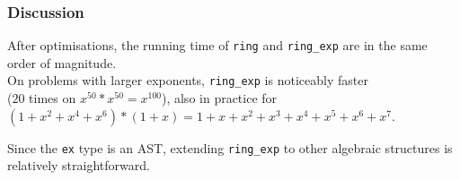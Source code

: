 \documentclass{beamer}
\newcommand{\lean}[1]{\texttt{#1}\xspace} %
\newcommand{\ring}{\lean{ring}}
\newcommand{\ringexp}{\lean{ring\_exp}}
\begin{document}
\begin{frame} \frametitle{Discussion}
After optimisations, the running time of \ring and \ringexp are in the same order of magnitude.\\[\jot]
On problems with larger exponents, \ringexp is noticeably faster\\
($20$ times on $x^{50} * x^{50} = x^{100}$),
also in practice for $(1 + x^2 + x^4 + x^6) * (1 + x) = 1 + x + x^2 + x^3 + x^4 + x^5 + x^6 + x^7$.

Since the \lean{ex} type is an AST, extending \ringexp to other algebraic structures is relatively straightforward.
\end{frame}
\end{document}
